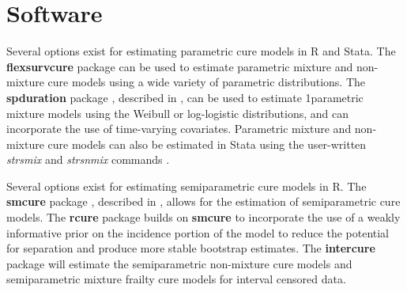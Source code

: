 



\section{Software}
		Several options exist for estimating parametric cure models in R and Stata. The \textbf{flexsurvcure} package \citep{amdahl2017} can be used to estimate parametric mixture and non-mixture cure models using a wide variety of parametric distributions. The \textbf{spduration} package \citep{beger2017a}, described in \citep{beger2017a}, can be used to estimate 1parametric mixture models using the Weibull or log-logistic distributions, and can incorporate the use of time-varying covariates. Parametric mixture and non-mixture cure models can also be estimated in Stata using the user-written \textit{strsmix} and \textit{strsnmix} commands \citep{lambert2007}.
		
		Several options exist for estimating semiparametric cure models in R. The \textbf{smcure} package \citep{cai2012a}, described in \citep{cai2012}, allows for the estimation of semiparametric cure models. The \textbf{rcure} package \citep{han2017} builds on \textbf{smcure} to incorporate the use of a weakly informative prior on the incidence portion of the model to reduce the potential for separation and produce more stable bootstrap estimates. The \textbf{intercure} package \citep{brettas2016} will estimate the semiparametric non-mixture cure models and semiparametric mixture frailty cure models for interval censored data. 

